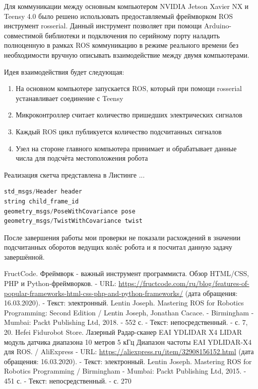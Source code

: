\documentclass[12pt,a4paper]{scrartcl}
\newlength{\ML}
\begin{document}
			Для коммуникации между основным компьютером NVIDIA Jetson Xavier NX и Teensy 4.0 было решено использовать предоставляемый фреймворком ROS инструмент rosserial. Данный инструмент позволяет при помощи Arduino-совместимой библиотеки и подключения по серийному порту наладить полноценную в рамках ROS коммуникацию в режиме реального времени без необходимости вручную описывать взаимодействие между двумя компьютерами.
			
			Идея взаимодействия будет следующая:
			\begin{enumerate}
				\item На основном компьютере запускается ROS, который при помощи rosserial устанавливает соединение с Teensy
				\item Микроконтроллер считает количество пришедших электрических сигналов
				\item Каждый ROS цикл публикуется количество подсчитанных сигналов
				\item Узел на стороне главного компьютера принимает и обрабатывает данные числа для подсчёта местоположения робота
			\end{enumerate}
			
			Реализация скетча представлена в Листинге ...
			
			\begin{lstlisting}[language=C,caption={Формат сообщения nav\_msgs/Odometry},label={lst:OdometryMsg}]
std_msgs/Header header
string child_frame_id
geometry_msgs/PoseWithCovariance pose
geometry_msgs/TwistWithCovariance twist
			\end{lstlisting}	
			
			После завершения работы мои проверки не показали расхождений в значении подсчитанных оборотов ведущих колёс робота и я посчитал данную задачу завершённой.
			
	\begin{thebibliography}{9}
		 FructCode. Фреймворк - важный инструмент программиста. Обзор HTML/CSS, PHP и Python-фреймворков. - URL:
 \url{https://fructcode.com/ru/blog/features-of-popular-frameworks-html-css-php-and-python-frameworks/} (дата обращения: 16.03.2020). - Текст: электронный.
		 Lentin Joseph. Mastering ROS for Robotics Programming: Second Edition / Lentin Joseph, Jonathan Cacace. - Birmingham - Mumbai: Packt Publishing Ltd, 2018. - 552 с. - Текст: непосредственный. - с. 7, 20.
		 Hefei Fidurobot Store. Лазерный Радар-сканер EAI YDLIDAR X4 LIDAR модуль датчика диапазона 10 метров 5 кГц Диапазон частоты EAI YDLIDAR-X4 для ROS. / AliExpress - URL: \url{https://aliexpress.ru/item/32908156152.html} (дата обращения: 16.03.2020). - Текст: электронный.
		 Lentin Joseph. Mastering ROS for Robotics Programming / Birmingham - Mumbai: Packt Publishing Ltd, 2015. - 451 с. - Текст: непосредственный. - с. 270
	\end{thebibliography}
			
	
\end{document}
